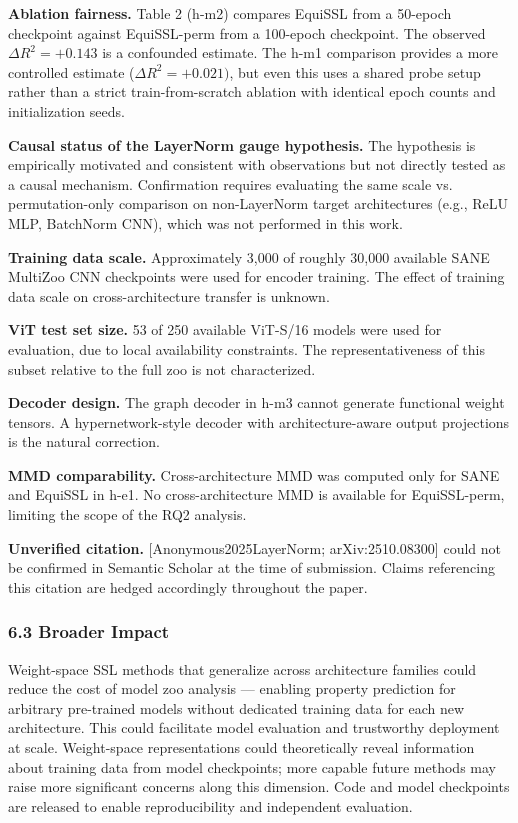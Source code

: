\textbf{Ablation fairness.} Table 2 (h-m2) compares EquiSSL from a 50-epoch checkpoint against EquiSSL-perm from a 100-epoch checkpoint. The observed $\Delta R^{2}=+0.143$ is a confounded estimate. The h-m1 comparison provides a more controlled estimate ($\Delta R^{2}=+0.021)$, but even this uses a shared probe setup rather than a strict train-from-scratch ablation with identical epoch counts and initialization seeds.

\textbf{Causal status of the LayerNorm gauge hypothesis.} The hypothesis is empirically motivated and consistent with observations but not directly tested as a causal mechanism. Confirmation requires evaluating the same scale vs. permutation-only comparison on non-LayerNorm target architectures (e.g., ReLU MLP, BatchNorm CNN), which was not performed in this work.

\textbf{Training data scale.} Approximately 3,000 of roughly 30,000 available SANE MultiZoo CNN checkpoints were used for encoder training. The effect of training data scale on cross-architecture transfer is unknown.

\textbf{ViT test set size.} 53 of 250 available ViT-S/16 models were used for evaluation, due to local availability constraints. The representativeness of this subset relative to the full zoo is not characterized.

\textbf{Decoder design.} The graph decoder in h-m3 cannot generate functional weight tensors. A hypernetwork-style decoder with architecture-aware output projections is the natural correction.

\textbf{MMD comparability.} Cross-architecture MMD was computed only for SANE and EquiSSL in h-e1. No cross-architecture MMD is available for EquiSSL-perm, limiting the scope of the RQ2 analysis.

\textbf{Unverified citation.} [Anonymous2025LayerNorm; arXiv:2510.08300] could not be confirmed in Semantic Scholar at the time of submission. Claims referencing this citation are hedged accordingly throughout the paper.

\subsubsection{6.3 Broader Impact}

Weight-space SSL methods that generalize across architecture families could reduce the cost of model zoo analysis --- enabling property prediction for arbitrary pre-trained models without dedicated training data for each new architecture. This could facilitate model evaluation and trustworthy deployment at scale. Weight-space representations could theoretically reveal information about training data from model checkpoints; more capable future methods may raise more significant concerns along this dimension. Code and model checkpoints are released to enable reproducibility and independent evaluation.


